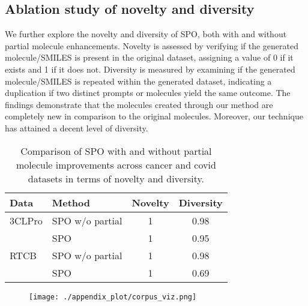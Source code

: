 {
\subsection{Ablation study of novelty and diversity}\label{spo_validity}


We further explore the novelty and diversity of SPO, both with and without partial molecule enhancements. Novelty is assessed by verifying if the generated molecule/SMILES is present in the original dataset, assigning a value of 0 if it exists and 1 if it does not. Diversity is measured by examining if the generated molecule/SMILES is repeated within the generated dataset, indicating a duplication if two distinct prompts or molecules yield the same outcome. The findings demonstrate that the molecules created through our method are completely new in comparison to the original molecules. Moreover, our technique has attained a decent level of diversity.


\begin{table}[h!]
\centering
\begin{tabular}{|l|l|c|c|}
\hline
\textbf{Data} & \textbf{Method}        & \textbf{Novelty} & \textbf{Diversity} \\ \hline
3CLPro        & SPO w/o partial        & 1               & 0.98               \\ \cline{2-4} 
              & SPO                    & 1               & 0.95               \\ \hline
RTCB          & SPO w/o partial        & 1               & 0.98               \\ \cline{2-4} 
              & SPO                    & 1               & 0.69               \\ \hline
\end{tabular}
\caption{Comparison of SPO with and without partial molecule improvements across cancer and covid datasets in terms of novelty and diversity.}
\label{tab:validity_comparison}
\end{table}
}

\begin{figure}[ht!]
    \centering
    \texttt{[image: ./appendix\_plot/corpus\_viz.png]}
    \caption{}
    \label{fig:corpus_fiz}
\end{figure}

